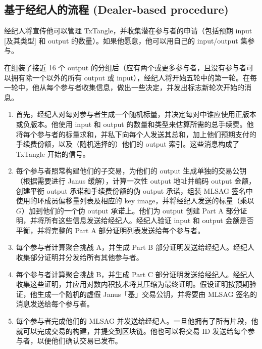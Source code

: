 \subsection{基于经纪人的流程 (Dealer-based procedure)}
\label{subsec:dealer-procedure-txtangle}

经纪人将宣传他可以管理 TxTangle，并收集潜在参与者的申请（包括预期 input [及其类型] 和 output 的数量）。如果他愿意，他可以用自己的 input/output 集参与。

在组装了接近 16 个 output 的分组后（应有两个或更多参与者，且没有参与者可以拥有除一个以外的所有 output 或 input），经纪人将开始五轮中的第一轮。在每一轮中，他从每个参与者收集信息，做出一些决定，并发出标志新轮次开始的消息。

\begin{enumerate}
    \item 首先，经纪人对每对参与者生成一个随机标量，并决定每对中谁应使用正版本或负版本。他使用 input 和 output 的数量和类型来估算所需的总手续费。他将每个参与者的标量求和，并私下向每个人发送其总和，加上他们预期支付的手续费份额，以及（随机选择的）他们的 output 索引。这些消息构成了 TxTangle 开始的信号。

    \item 每个参与者照常构建他们的子交易，为他们的 output 生成单独的交易公钥（根据需要进行 Janus 缓解），计算一次性 output 地址并编码 output 金额，创建平衡 output 承诺和手续费份额的伪 output 承诺，组装 MLSAG 签名中使用的环成员偏移量列表及相应的 key image，并将经纪人发送的标量（乘以 $G$）加到他们的一个伪 output 承诺上。他们为 output 创建 Part A 部分证明，并将所有这些信息发送给经纪人。经纪人验证 input 和 output 金额是否平衡，并将完整的 Part A 部分证明列表发送给每个参与者。

    \item 每个参与者计算聚合挑战 A，并生成 Part B 部分证明发送给经纪人。经纪人收集部分证明并分发给所有其他参与者。

    \item 每个参与者计算聚合挑战 B，并生成 Part C 部分证明发送给经纪人。经纪人收集这些证明，并应用对数内积技术将其压缩为最终证明。假设证明按预期验证，他生成一个随机的虚假 Janus「基」交易公钥，并将要由 MLSAG 签名的消息发送给每个参与者。

    \item 每个参与者完成他们的 MLSAG 并发送给经纪人。一旦他拥有了所有片段，他就可以完成交易的构建，并提交到区块链。他也可以将交易 ID 发送给每个参与者，以便他们确认交易已发布。
\end{enumerate}{}
